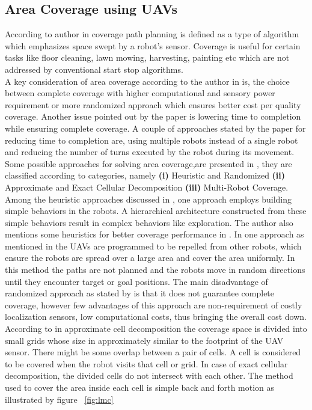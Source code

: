 \subsection{Area Coverage using UAVs}
According to author in \cite{1} coverage path planning is defined as a type of algorithm which emphasizes space swept by a robot's sensor. Coverage is useful for certain tasks like floor cleaning, lawn mowing, harvesting, painting etc which are not addressed by conventional start stop algorithms. \\
A key consideration of area coverage according to the author in \cite{1} is, the choice between complete coverage with higher computational and sensory power requirement or more randomized approach which ensures better cost per quality coverage. Another issue pointed out by the paper is lowering time to completion while ensuring complete coverage. A couple of approaches stated by the paper for reducing time to completion are, using multiple robots instead of a single robot and reducing the number of turns executed by the robot during its movement. Some possible approaches for solving area coverage,are presented in \cite{1}, they are classified according to categories, namely \textbf{(i)} Heuristic and Randomized \textbf{(ii)} Approximate and Exact Cellular Decomposition \textbf{(iii)} Multi-Robot Coverage. \\
Among the heuristic approaches discussed in \cite{1}, one approach employs building simple behaviors in the robots. A hierarchical architecture constructed from these simple behaviors result in complex behaviors like exploration. The author also mentions some heuristics for better coverage performance in \cite{1} . In one approach as mentioned in \cite{1} the UAVs are programmed to be repelled from other robots, which ensure the robots are spread over a large area and cover the area uniformly. In this method the paths are not planned and the robots move in random directions until they encounter target or goal positions. The main disadvantage of randomized approach as stated by \cite{1} is that it does not guarantee complete coverage, however few advantages of this approach are non-requirement of costly localization sensors, low  computational costs, thus bringing the overall cost down. \\
According to \cite{1} in approximate cell decomposition the coverage space is divided into small grids whose size in approximately similar to the footprint of the UAV sensor. There might be some overlap between a pair of cells. A cell is considered to be covered when the robot visits that cell or grid. In case of exact cellular decomposition, the divided cells do not intersect with each other. The method used to cover the area inside each cell is simple back and forth motion as illustrated by figure ~\ref{fig:lmc}

